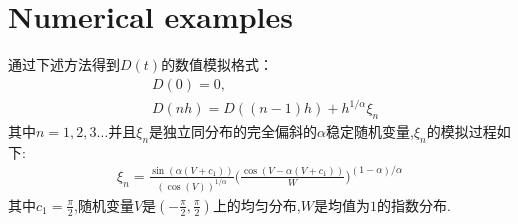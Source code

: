 \documentclass[12pt,final]{article}
\makeatletter
\numberwithin{equation}{section}
\numberwithin{figure}{section}
\numberwithin{table}{section}
\theoremstyle{plain}
\renewcommand{\proofname}{proof}
\theoremstyle{Definition}
\theoremstyle{Remark}
\renewenvironment{proof}[1][\proofname]{\par
	\pushQED{\qed}%
	\normalfont \topsep6\p@\@plus6\p@\relax
	\trivlist\item[\hskip\labelsep
	\bfseries #1\@addpunct{\,:\,}]\ignorespaces
}{%
	\popQED\endtrivlist\@endpefalse
}
\makeatother
\begin{document}
\begin{proof}
	\end{proof}
	
	\section{Numerical examples}
	通过下述方法得到$D(t)$的数值模拟格式：\\
	\begin{align*}
		&D(0)=0,\\
		&D(nh)=D((n-1)h)+h^{1/\alpha}\xi_{n}
	\end{align*}
	其中$n=1,2,3 \ldots$并且$\xi_n$是独立同分布的完全偏斜的$\alpha$稳定随机变量,$\xi_n$的模拟过程如下:
	\begin{align*}
		\xi_n=\frac{\sin(\alpha(V+c_1))}{\left(\cos(V)\right)^{1/\alpha}}\Big(\frac{\cos(V-\alpha(V+c_1))}{W}\Big)^{(1-\alpha)/\alpha}
	\end{align*}
	其中$c_1 = \frac{\pi}{2}$,随机变量$V$是$(-\frac{\pi}{2},\frac{\pi}{2})$上的均匀分布,$W$是均值为$1$的指数分布.
\end{document}
